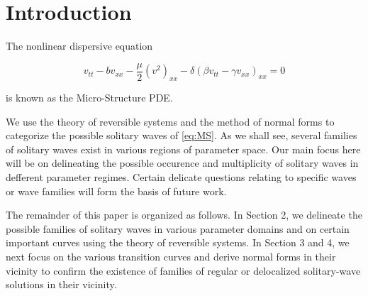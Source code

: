 \section{Introduction}

The nonlinear dispersive equation \cite{Roy1}
 

\begin{equation}\label{eq:MS}
v_{tt} - b v_{xx} - \frac{\mu}{2} \left( v^2 \right)_{xx} - \delta \left( \beta v_{tt} - \gamma v_{xx}\right)_{xx} = 0 
\end{equation}

is known as the Micro-Structure PDE. 


We use the theory of reversible systems and the method of normal forms to categorize the possible solitary waves of \eqref{eq:MS}.
As we shall see, several families of solitary waves exist in various regions of parameter space. Our main focus here will be on 
delineating the possible occurence and multiplicity of solitary waves in defferent parameter regimes. Certain delicate questions
relating to specific waves or wave families will form the basis of future work. 

The remainder of this paper is organized as follows. In Section 2, we delineate the possible families of solitary waves
in various parameter domains and on certain important curves using the theory of reversible systems. In Section 3 and 4, we next
focus on the various transition curves and derive normal forms in their vicinity to confirm the existence of families of 
regular or delocalized solitary-wave solutions in their vicinity.
